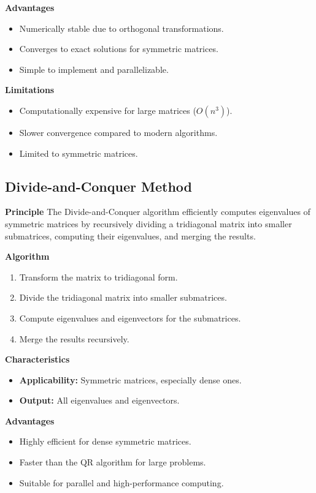 \documentclass{article}
\begin{document}
\textbf{Advantages}
\begin{itemize}
    \item Numerically stable due to orthogonal transformations.
    \item Converges to exact solutions for symmetric matrices.
    \item Simple to implement and parallelizable.
\end{itemize}

\textbf{Limitations}
\begin{itemize}
    \item Computationally expensive for large matrices (\(O(n^3)\)).
    \item Slower convergence compared to modern algorithms.
    \item Limited to symmetric matrices.
\end{itemize}

\subsection{Divide-and-Conquer Method}

\textbf{Principle}
The Divide-and-Conquer algorithm efficiently computes eigenvalues of symmetric matrices by recursively dividing a tridiagonal matrix into smaller submatrices, computing their eigenvalues, and merging the results.

\textbf{Algorithm}
\begin{enumerate}
    \item Transform the matrix to tridiagonal form.
    \item Divide the tridiagonal matrix into smaller submatrices.
    \item Compute eigenvalues and eigenvectors for the submatrices.
    \item Merge the results recursively.
\end{enumerate}

\textbf{Characteristics}
\begin{itemize}
    \item \textbf{Applicability:} Symmetric matrices, especially dense ones.
    \item \textbf{Output:} All eigenvalues and eigenvectors.
\end{itemize}

\textbf{Advantages}
\begin{itemize}
    \item Highly efficient for dense symmetric matrices.
    \item Faster than the QR algorithm for large problems.
    \item Suitable for parallel and high-performance computing.
\end{itemize}
\end{document}
